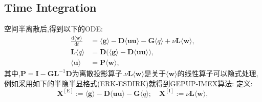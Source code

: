 \documentclass[12pt,halfline,a4paper]{ouparticle}
\begin{document}
\subsection{Time Integration}
空间半离散后,得到以下的ODE:
\begin{align}
    \frac{\mathrm{d} \langle\boldsymbol{w} \rangle} {\mathrm{d} t}&=\langle\boldsymbol{g} \rangle-\boldsymbol{D} \langle\boldsymbol{u} \boldsymbol{u} \rangle-\boldsymbol{G} \langle q \rangle+\nu\boldsymbol{L} \langle\boldsymbol{w} \rangle, \\ 
\boldsymbol{L} \langle q \rangle&=\boldsymbol{D} \big( \langle\boldsymbol{g} \rangle-\boldsymbol{D} \langle\boldsymbol{u} \boldsymbol{u} \rangle\big),\label{eq:Possion_q}\\ 
\langle\boldsymbol{u} \rangle&=\boldsymbol{P} \langle\boldsymbol{w} \rangle, \label{eq:projection_new_velocity}
\end{align}
其中,$\boldsymbol{P} = \boldsymbol{I} - \boldsymbol{G}\boldsymbol{L}^{-1}\boldsymbol{D}$为离散投影算子.$ \nu\boldsymbol{L}\langle\boldsymbol{w} \rangle$是关于$\langle\boldsymbol{w}\rangle$的线性算子可以隐式处理,例如采用如下的半隐半显格式(ERK-ESDIRK)就得到GEPUP-IMEX算法:
\newline
定义:
$$
\boldsymbol{X}^{\mathrm{[ E ]}} :=\langle\boldsymbol{g} \rangle-\boldsymbol{D} \langle\boldsymbol{u} \boldsymbol{u} \rangle-\boldsymbol{G} \langle q \rangle; \quad\boldsymbol{X}^{\mathrm{[ I ]}} :=\nu\boldsymbol{L} \langle\boldsymbol{w} \rangle, 
$$
\end{document}
